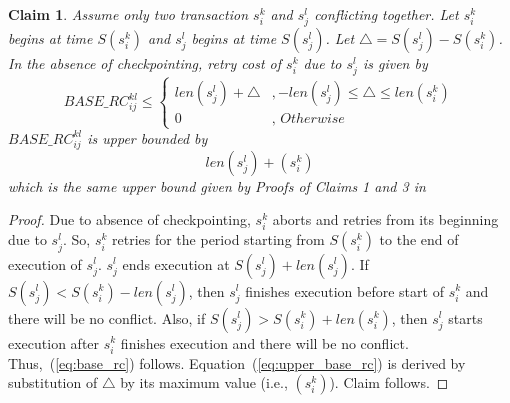 \documentclass[conference]{IEEEtran}
\newtheorem{clm}{Claim}
\begin{document}
\begin{clm}\label{clm:basic_rc}
Assume only two transaction $s_i^k$ and $s_j^l$ conflicting together. Let $s_i^k$ begins at time $S\left(s_i^k\right)$ and $s_j^l$ begins at time $S\left(s_j^l\right)$. Let $\triangle=S\left(s_j^l\right)-S\left(s_i^k\right)$. In the absence of checkpointing, retry cost of $s_i^k$ due to $s_j^l$ is given by
%
\begin{equation}
BASE\_RC_{ij}^{kl} \le \begin{cases}
len\left(s_{j}^{l}\right)+\triangle & ,-len\left(s_{j}^{l}\right)\le\triangle\le len\left(s_{i}^{k}\right)\\
0 & ,\, Otherwise
\end{cases}
\label{eq:base_rc}
\end{equation}
%
$BASE\_RC_{ij}^{kl}$ is upper bounded by 
\begin{equation}
len\left(s_j^l\right)+\left(s_i^k\right)\label{eq:upper_base_rc}
\end{equation}
%
which is the same upper bound given by Proofs of Claims 1 and 3 in~\cite{stmconcurrencycontrol:emsoft11}
\end{clm}
%
\begin{proof}
Due to absence of checkpointing, $s_i^k$ aborts and retries from its beginning due to $s_j^l$. So, $s_i^k$ retries for the period starting from $S\left(s_i^k\right)$ to the end of execution of $s_j^l$. $s_j^l$ ends execution at $S\left(s_j^l\right)+len\left(s_j^l\right)$. If $S\left(s_j^l\right)<S\left(s_i^k\right)-len\left(s_j^l\right)$, then $s_j^l$ finishes execution before start of $s_i^k$ and there will be no conflict. Also, if $S\left(s_j^l\right)>S\left(s_i^k\right)+len\left(s_i^k\right)$, then $s_j^l$ starts execution after $s_i^k$ finishes execution and there will be no conflict. Thus,~(\ref{eq:base_rc}) follows. Equation~(\ref{eq:upper_base_rc}) is derived by substitution of $\triangle$ by its maximum value (i.e., $\left(s_{i}^{k}\right)$). Claim follows.
\end{proof}
%
\end{document}
